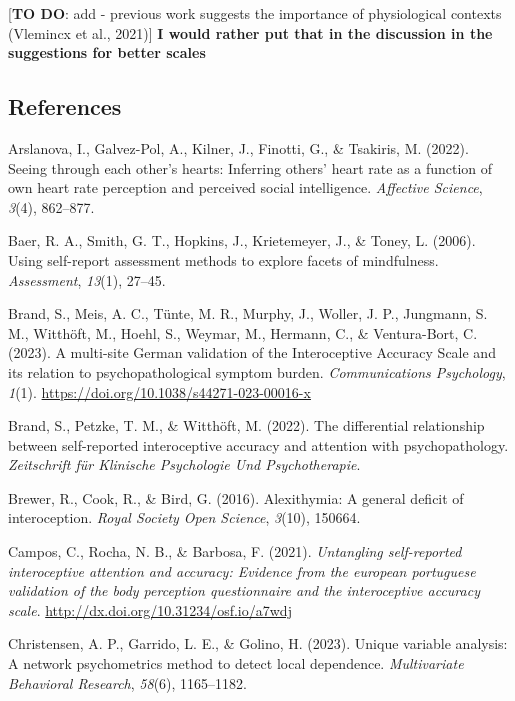 \documentclass[
  man,
  floatsintext,
  longtable,
  nolmodern,
  notxfonts,
  notimes,
  colorlinks=true,linkcolor=blue,citecolor=blue,urlcolor=blue]{apa7}
\newlength{\cslhangindent}
\newenvironment{CSLReferences}[2] %
 {\begin{list}{}{%
  \setlength{\itemindent}{0pt}
  \setlength{\leftmargin}{0pt}
  \setlength{\parsep}{0pt}
  \ifodd #1
   \setlength{\leftmargin}{\cslhangindent}
   \setlength{\itemindent}{-1\cslhangindent}
  \fi
  \setlength{\itemsep}{#2\baselineskip}}}
 {\end{list}}
\begin{document}
{[}\textbf{TO DO}: add - previous work suggests the importance of
physiological contexts (Vlemincx et al., 2021){]} \textbf{I would rather
put that in the discussion in the suggestions for better scales}

\subsection{References}\label{references}

\label{refs}
\begin{CSLReferences}{1}{0}
Arslanova, I., Galvez-Pol, A., Kilner, J., Finotti, G., \& Tsakiris, M.
(2022). Seeing through each other's hearts: Inferring others' heart rate
as a function of own heart rate perception and perceived social
intelligence. \emph{Affective Science}, \emph{3}(4), 862--877.

Baer, R. A., Smith, G. T., Hopkins, J., Krietemeyer, J., \& Toney, L.
(2006). Using self-report assessment methods to explore facets of
mindfulness. \emph{Assessment}, \emph{13}(1), 27--45.

Brand, S., Meis, A. C., Tünte, M. R., Murphy, J., Woller, J. P.,
Jungmann, S. M., Witthöft, M., Hoehl, S., Weymar, M., Hermann, C., \&
Ventura-Bort, C. (2023). A multi-site German validation of the
Interoceptive Accuracy Scale and its relation to psychopathological
symptom burden. \emph{Communications Psychology}, \emph{1}(1).
\url{https://doi.org/10.1038/s44271-023-00016-x}

Brand, S., Petzke, T. M., \& Witthöft, M. (2022). The differential
relationship between self-reported interoceptive accuracy and attention
with psychopathology. \emph{Zeitschrift f{ü}r Klinische Psychologie Und
Psychotherapie}.

Brewer, R., Cook, R., \& Bird, G. (2016). Alexithymia: A general deficit
of interoception. \emph{Royal Society Open Science}, \emph{3}(10),
150664.

Campos, C., Rocha, N. B., \& Barbosa, F. (2021). \emph{Untangling
self-reported interoceptive attention and accuracy: Evidence from the
european portuguese validation of the body perception questionnaire and
the interoceptive accuracy scale}.
\url{http://dx.doi.org/10.31234/osf.io/a7wdj}

Christensen, A. P., Garrido, L. E., \& Golino, H. (2023). Unique
variable analysis: A network psychometrics method to detect local
dependence. \emph{Multivariate Behavioral Research}, \emph{58}(6),
1165--1182.


\end{CSLReferences}
\end{document}
